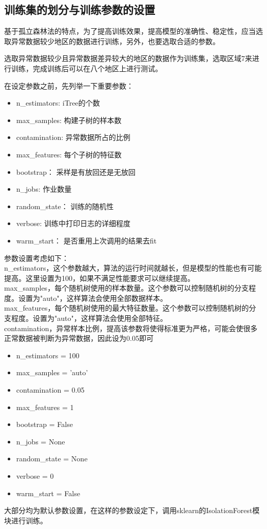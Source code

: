 \documentclass[UTF8]{article}
\begin{document}
			\subsection{训练集的划分与训练参数的设置}
			\par 基于孤立森林法的特点，为了提高训练效果，提高模型的准确性、稳定性，应当选取异常数据较少地区的数据进行训练，另外，也要选取合适的参数。\cite{zhihuiif1}
			\par 选取异常数据较少且异常数据差异较大的地区的数据作为训练集，选取区域7来进行训练，完成训练后可以在八个地区上进行测试。
			\newpage \par 在设定参数之前，先列举一下重要参数：
			\begin{itemize}
				\item n\_estimators: iTree的个数
				\item max\_samples: 构建子树的样本数
				\item contamination: 异常数据所占的比例
				\item max\_features: 每个子树的特征数
				\item bootstrap： 采样是有放回还是无放回
				\item n\_jobs: 作业数量
				\item random\_state： 训练的随机性 
				\item verbose: 训练中打印日志的详细程度
				\item warm\_start： 是否重用上次调用的结果去fit
			\end{itemize}
				\par 参数设置考虑如下：
				\\n\_estimators，这个参数越大，算法的运行时间就越长，但是模型的性能也有可能提高。这里设置为100，如果不满足性能要求可以继续提高。
				\\max\_samples，每个随机树使用的样本数量。这个参数可以控制随机树的分支程度。设置为"auto"，这样算法会使用全部数据样本。
				\\max\_features，每个随机树使用的最大特征数量。这个参数可以控制随机树的分支程度。设置为"auto"，这样算法会使用全部特征。
				\\contamination，异常样本比例，提高该参数将使得标准更为严格，可能会使很多正常数据被判断为异常数据，因此设为0.05即可
				\begin{itemize}
					\item n\_estimators = 100
					\item max\_samples = 'auto'
					\item contamination = 0.05
					\item max\_features = 1
					\item bootstrap = False
					\item n\_jobs = None
					\item random\_state = None 
					\item verbose = 0
					\item warm\_start = False
				\end{itemize}
				大部分均为默认参数设置，在这样的参数设定下，调用sklearn的IsolationForest模块进行训练。
\end{document}
